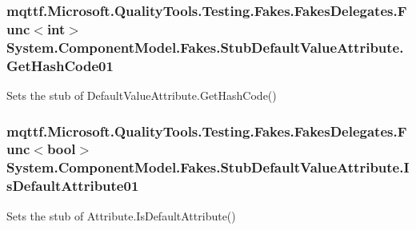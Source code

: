\hypertarget{class_system_1_1_component_model_1_1_fakes_1_1_stub_default_value_attribute_a12fd1237f4cc51887e0f4d795af20671}{
\subsubsection[{Get\-Hash\-Code01}]{\setlength{\rightskip}{0pt plus 5cm}mqttf.\-Microsoft.\-Quality\-Tools.\-Testing.\-Fakes.\-Fakes\-Delegates.\-Func$<$int$>$ System.\-Component\-Model.\-Fakes.\-Stub\-Default\-Value\-Attribute.\-Get\-Hash\-Code01}}\label{class_system_1_1_component_model_1_1_fakes_1_1_stub_default_value_attribute_a12fd1237f4cc51887e0f4d795af20671}


Sets the stub of Default\-Value\-Attribute.\-Get\-Hash\-Code()

\hypertarget{class_system_1_1_component_model_1_1_fakes_1_1_stub_default_value_attribute_ac4b05f9611621c226f861ac208d35344}{
\subsubsection[{Is\-Default\-Attribute01}]{\setlength{\rightskip}{0pt plus 5cm}mqttf.\-Microsoft.\-Quality\-Tools.\-Testing.\-Fakes.\-Fakes\-Delegates.\-Func$<$bool$>$ System.\-Component\-Model.\-Fakes.\-Stub\-Default\-Value\-Attribute.\-Is\-Default\-Attribute01}}\label{class_system_1_1_component_model_1_1_fakes_1_1_stub_default_value_attribute_ac4b05f9611621c226f861ac208d35344}


Sets the stub of Attribute.\-Is\-Default\-Attribute()

